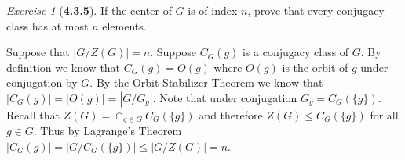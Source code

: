 \documentclass[12pt]{amsart}
\makeatletter
\theoremstyle{remark}
\newtheorem*{exercise}{Exercise}%
\renewenvironment{proof}[1][\proofname]{\par\doublespacing
  \pushQED{\qed}%
  \normalfont \topsep6\p@\@plus6\p@\relax
  \list{}{%
    \settowidth{\leftmargin}{\itshape\proofname:\hskip\labelsep}%
    \setlength{\labelwidth}{0pt}%
    \setlength{\itemindent}{-\leftmargin}%
  }%
  \item[\hskip\labelsep\itshape#1\@addpunct{:}]\ignorespaces
}{%
  \popQED\endlist\@endpefalse
  \singlespacing
}
\theoremstyle{mycomment}
\makeatother
\begin{document}
\begin{exercise}[\textbf{4.3.5}] If the center of $G$ is of index $n$, prove that every conjugacy class has at most $n$ elements. 
  \begin{proof} Suppose that $|G/Z(G)| = n$. Suppose $C_G(g)$ is a conjugacy class of $G$. By definition we know that $C_G(g) = O(g)$ where $O(g)$ is the orbit of $g$ under conjugation by $G$.
  By the Orbit Stabilizer Theorem we know that $|C_G(g)| = |O(g)| = |G/G_g|$. Note that under conjugation $G_g = C_G(\{g\})$. Recall that $Z(G) = \cap_{g \in G} C_G(\{g\})$ and therefore $Z(G) \leq  C_G(\{g\})$ for all $g \in G$. Thus by Lagrange's Theorem $|C_G(g)| = |G/C_G(\{g\})| \leq |G/Z(G)| = n$.
  \end{proof}
\end{exercise}
\vspace{.15in}
\end{document}
